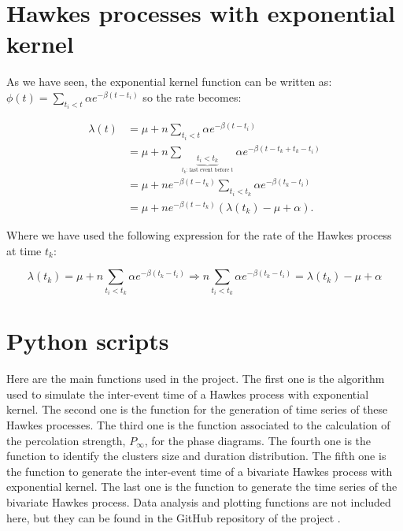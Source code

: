 \chapter{Hawkes processes with exponential kernel}\label{ch:Anexo calculos}
As we have seen, the exponential kernel function can be written as: $\phi(t)=\sum_{t_i<t}\alpha e^{-\beta(t-t_i)}$ so the rate becomes:

\begin{equation}
    \begin{split}
        \lambda(t) &= \mu + n\sum_{t_i<t}\alpha e^{-\beta(t-t_i)}\\
        &= \mu + n\sum_{\underbrace{t_i<t_k}_{t_k\text{: last event before t}}}\alpha e^{-\beta(t-t_k+t_k-t_i)}\\
        &= \mu + ne^{-\beta(t-t_k)}\sum_{t_i<t_k}\alpha e^{-\beta(t_k-t_i)}\\
        &= \mu + ne^{-\beta(t-t_k)}\left( \lambda(t_k)-\mu+\alpha \right).
    \end{split}
    \label{eq: Hawkes rate exponential becomes Markovian}
\end{equation}

Where we have used the following expression for the rate of the Hawkes process at time $t_k$:

\begin{equation}
    \lambda(t_k) =\mu+n\sum_{t_i<t_k}\alpha e^{-\beta(t_k-t_i)}\Rightarrow n\sum_{t_i<t_k}\alpha e^{-\beta(t_k-t_i)} = \lambda(t_k)-\mu+\alpha
    \label{eq: Hawkes rate at event time}
\end{equation}

\chapter{Python scripts}\label{ch:Anexo}
Here are the main functions used in the project. The first one is the algorithm used to simulate the inter-event time of a Hawkes process with exponential kernel. 
The second one is the function for the generation of time series of these Hawkes processes. The third one is the function associated to the calculation of the percolation strength, $P_\infty$,
for the phase diagrams. The fourth one is the function to identify the clusters size and duration distribution. The fifth one is the function to generate the inter-event time of a 
bivariate Hawkes process with exponential kernel. The last one is the function to generate the time series of the bivariate Hawkes process. Data analysis and plotting functions are not included
here, but they can be found in the GitHub repository of the project \cite{github}.

